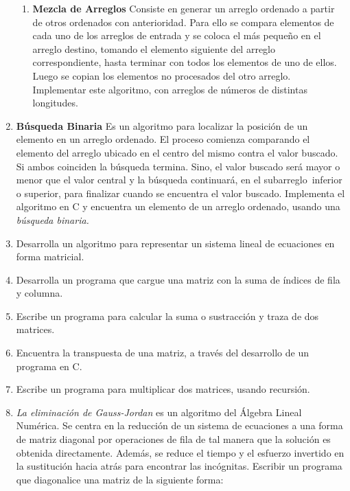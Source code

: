\documentclass[11pt,a4paper]{article}
\newcounter{num}
\begin{document}
\begin{enumerate}
\begin{enumerate}
\item \textbf{Mezcla de Arreglos} Consiste en generar un arreglo ordenado a partir de otros \mbox{ordenados} con anterioridad. Para ello se compara  elementos de cada uno de los \mbox{arreglos} de entrada y se coloca el m\'as peque\~no en el arreglo destino, tomando el elemento \mbox{siguiente} del arreglo correspondiente, hasta terminar con todos los elementos de uno de ellos. Luego se copian los elementos no procesados del otro arreglo. Implementar este algoritmo, con arreglos  de n\'umeros de distintas longitudes.
\end{enumerate}

\item \textbf{B\'usqueda Binaria} Es un algoritmo para localizar la posici\'on de un elemento en un \mbox{arreglo} ordenado. El proceso comienza comparando el elemento del arreglo ubicado en el \mbox{centro} del mismo contra el valor buscado. Si ambos coinciden la b\'usqueda termina. Sino, el valor buscado ser\'a mayor o menor que el valor central y la b\'usqueda continuar\'a, en el \mbox{subarreglo inferior} o superior, para finalizar cuando se encuentra el valor buscado. \mbox{Implementa} el \mbox{algoritmo} en C y encuentra un elemento de un arreglo ordenado, usando una \textit{b\'usqueda \mbox{binaria}.}

\item Desarrolla un algoritmo para representar un sistema lineal de ecuaciones en forma matricial.
\item Desarrolla un programa que cargue una matriz con la suma de \'indices de fila y columna.
\item Escribe un programa para calcular la suma o sustracci\'on y traza de dos matrices.
\item Encuentra la transpuesta de una matriz, a trav\'es del desarrollo de un programa en C.
\item Escribe un programa para multiplicar dos matrices, usando recursi\'on.
\item \textit{La eliminaci\'on de Gauss-Jordan} es un algoritmo del \'Algebra Lineal Num\'erica. Se centra en la reducci\'on de un  sistema de ecuaciones a una forma de matriz diagonal por operaciones de fila de tal manera que la soluci\'on es obtenida directamente. Adem\'as, se reduce el tiempo y el esfuerzo invertido en la sustituci\'on hacia atr\'as para encontrar las inc\'ognitas. Escribir un programa que diagonalice una matriz de la siguiente forma:


\end{enumerate}
\end{document}
